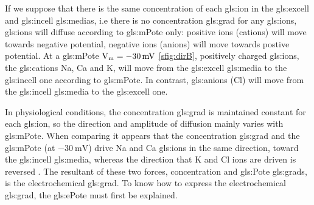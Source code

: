 \documentclass[class={myRUCProject}, crop=false]{standalone}
\begin{document}
If we suppose that there is the same concentration of each \gls{gls:ion} in the \gls{gls:excell} and \gls{gls:incell} \glspl{gls:media}, i.e there is no concentration \gls{gls:grad} for any \glspl{gls:ion}, \glspl{gls:ion} will diffuse according to \gls{gls:mPote} only: positive ions (cations) will move towards negative potential, negative ions (anions) will move towards postive potential. At a \gls{gls:mPote} \(\unit{\V\membrane}=\qty{-30}{\mV}\) \cref{sfig:dirB}, positively charged \glspl{gls:ion}, the \glspl{gls:cation} \gls{Na}, \gls{Ca} and \gls{K}, will move from the \gls{gls:excell} \gls{gls:media} to the \gls{gls:incell} one according to \gls{gls:mPote}. In contrast, \glspl{gls:anion} (\gls{Cl}) will move from the \gls{gls:incell} \gls{gls:media} to the \gls{gls:excell} one. 

In physiological conditions, the concentration \gls{gls:grad} is maintained constant for each \gls{gls:ion}, so the direction and amplitude of diffusion mainly varies with \gls{gls:mPote}. When comparing  it appears that the concentration \gls{gls:grad} and the \gls{gls:mPote} (at \(\qty{-30}{\mV}\)) drive \gls{Na} and \gls{Ca} \glspl{gls:ion} in the same direction, toward the \gls{gls:incell} \gls{gls:media}, whereas the direction that \gls{K} and \gls{Cl} ions are driven is reversed . The resultant of these two forces, concentration and \gls{gls:Pote} \glspl{gls:grad}, is the electrochemical \gls{gls:grad}. To know how to express the electrochemical \gls{gls:grad}, the \gls{gls:ePote} must first be explained.
 
\end{document}
